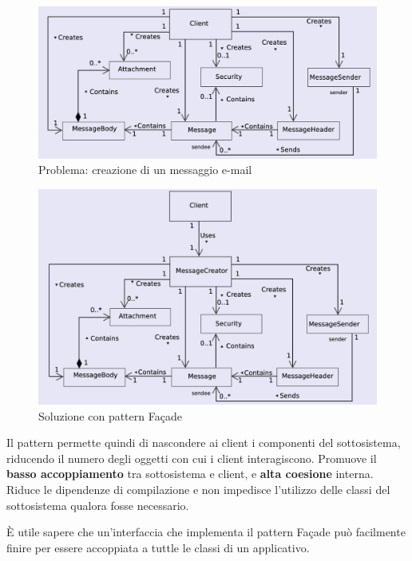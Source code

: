 \begin{figure}[H]
    \centering
    \includegraphics[width=1\linewidth]{assets/pattern/facade/facade-problema.png}
    \caption{Problema: creazione di un messaggio e-mail}
\end{figure}

\begin{figure}[H]
    \centering
    \includegraphics[width=1\linewidth]{assets/pattern/facade/facade-soluzione.png}
    \caption{Soluzione con pattern Façade}
\end{figure}

Il pattern permette quindi di nascondere ai client i componenti del sottosistema, riducendo il numero degli oggetti con cui i client interagiscono. Promuove il \textbf{basso accoppiamento} tra sottosistema e client, e \textbf{alta coesione} interna. Riduce le dipendenze di compilazione e non impedisce l'utilizzo delle classi del sottosistema qualora fosse necessario.

È utile sapere che un'interfaccia che implementa il pattern Façade può facilmente finire per essere accoppiata a tuttle le classi di un applicativo.

\newpage